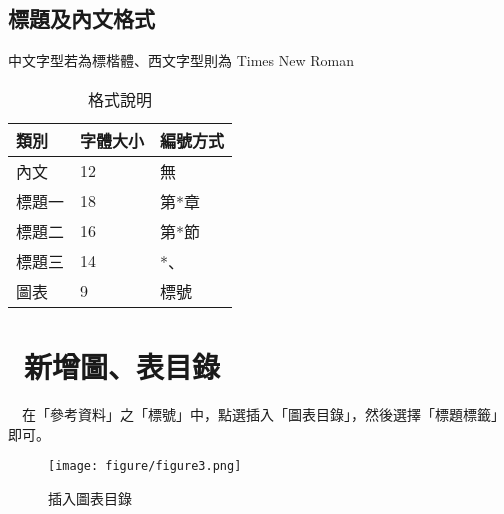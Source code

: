 \subsection{標題及內文格式}
中文字型若為標楷體、西文字型則為 Times New Roman
\begin{table}[]
\caption{格式說明}
\begin{tabular}{|l|l|l|}
\hline
類別  & 字體大小 & 編號方式 \\ \hline
內文  & 12   & 無    \\ \hline
標題一 & 18   & 第*章  \\ \hline
標題二 & 16   & 第*節  \\ \hline
標題三 & 14   & *、   \\ \hline
圖表  & 9    & 標號   \\ \hline
\end{tabular}
\end{table}
\clearpage
\section{~新增圖、表目錄 }
\label{se:se2}
　在「參考資料」之「標號」中，點選插入「圖表目錄」，然後選擇「標題標籤」即可。

\begin{figure}[b]
 \centering %
 \texttt{[image: figure/figure3.png]}
\caption{插入圖表目錄}
\end{figure}